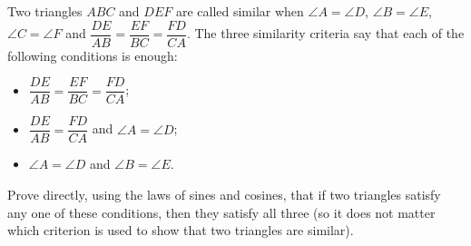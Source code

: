 Two triangles $ABC$ and $DEF$ are called similar when $\angle A=\angle D$, $\angle B=\angle E$, $\angle C=\angle F$ and $\dfrac{DE}{AB}=\dfrac{EF}{BC}=\dfrac{FD}{CA}$. The three similarity criteria say that each of the following conditions is enough:
\begin{itemize}
\item[(SSS)] $\dfrac{DE}{AB}=\dfrac{EF}{BC}=\dfrac{FD}{CA}$;
\item[(SAS)] $\dfrac{DE}{AB}=\dfrac{FD}{CA}$ and $\angle A=\angle D$;
\item[(AA)] $\angle A=\angle D$ and $\angle B=\angle E$.
\end{itemize}
Prove directly, using the laws of sines and cosines, that if two triangles satisfy any one of these conditions, then they satisfy all three (so it does not matter which criterion is used to show that two triangles are similar).
